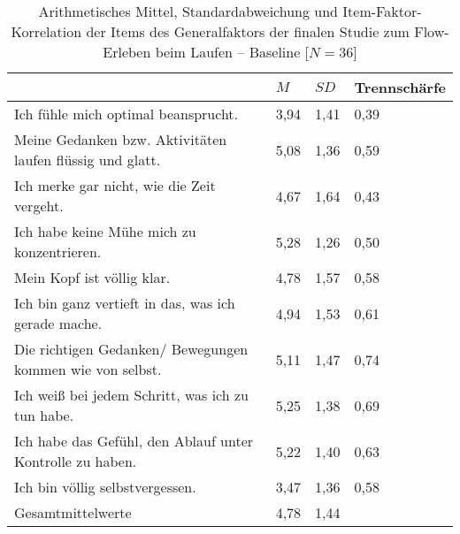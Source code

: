\pagebreak

\begin{table}[ht]
\centering
	\caption[Item-Faktor-Korrelation der Items des Generalfaktors -- Baseline (Studie: Laufen)]{Arithmetisches Mittel, Standardabweichung und Item-Faktor-Korrelation der Items des Generalfaktors der finalen Studie zum Flow-Erleben beim Laufen -- Baseline [$N = 36$]}
	\label{tab:generalfaktor_studie_laufen_baseline}
	\begin{tabularx}{\textwidth}{p{} p{} p{} p{}}
\toprule
& $M$ & $SD$ & Trennschärfe \\
\midrule
Ich fühle mich optimal beansprucht. & 3,94 & 1,41 & 0,39 \\ 
  Meine Gedanken bzw. Aktivitäten laufen flüssig und glatt. & 5,08 & 1,36 & 0,59 \\ 
  Ich merke gar nicht, wie die Zeit vergeht. & 4,67 & 1,64 & 0,43 \\ 
  Ich habe keine Mühe mich zu konzentrieren. & 5,28 & 1,26 & 0,50 \\ 
  Mein Kopf ist völlig klar. & 4,78 & 1,57 & 0,58 \\ 
  Ich bin ganz vertieft in das, was ich gerade mache. & 4,94 & 1,53 & 0,61 \\ 
  Die richtigen Gedanken/ Bewegungen kommen wie von selbst. & 5,11 & 1,47 & 0,74 \\ 
  Ich weiß bei jedem Schritt, was ich zu tun habe. & 5,25 & 1,38 & 0,69 \\ 
  Ich habe das Gefühl, den Ablauf unter Kontrolle zu haben. & 5,22 & 1,40 & 0,63 \\ 
  Ich bin völlig selbstvergessen. & 3,47 & 1,36 & 0,58 \\ 
  Gesamtmittelwerte & 4,78 & 1,44 &  \\ 
\bottomrule
\end{tabularx}
\end{table}

\pagebreak

